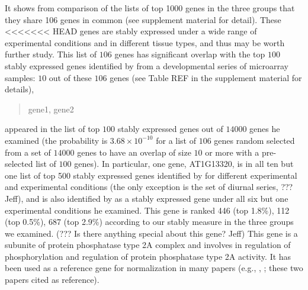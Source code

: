 \documentclass[11pt, a4paper]{article}
\begin{document}
It shows from comparison of the lists of top 1000 genes in the three groups that
they share 106 genes in common (see supplement material for detail).  These
<<<<<<< HEAD
genes are stably expressed under a wide range of experimental conditions and
in different tissue types, and thus may be worth further study.  This list of
$106$ genes has significant overlap with the top $100$ stably expressed genes
identified by \cite{czechowski2005genome} from a developmental series of
microarray samples: $10$ out of these $106$ genes (see Table REF in the
supplement material for details),
\begin{quote}
    gene1, gene2
\end{quote}
appeared in the list of top $100$ stably expressed genes
out of $14000$ genes he examined (the probability is $3.68\times10^{-10}$ for
a list of $106$ genes random selected from a set of $14000$ genes to have an
overlap of size $10$ or more with a pre-selected list of $100$ genes). In
particular, one gene, AT1G13320, is in all ten but one list of top 500 stably
expressed genes identified by \cite{czechowski2005genome} for different
experimental and experimental conditions (the only exception is the set of
diurnal series, ??? Jeff), and is also identified by
\cite{hong2010identification} as a stably expressed gene under all six but one
experimental conditions he examined.  This gene is ranked 446 (top 1.8\%), 112
(top 0.5\%), 687 (top 2.9\%) according to our stably measure in the three
groups we examined.  (??? Is there anything special about this gene? Jeff)
This gene is a subunite of protein phosphatase type 2A complex and involves in
regulation of phosphorylation and regulation of protein phosphatase type 2A
activity. It has been used as a reference gene for normalization in many
papers (e.g., \cite{bournier2013arabidopsis}, \cite{baron2012transcriptional};
these two papers cited \cite{czechowski2005genome} as reference). 
\end{document}
